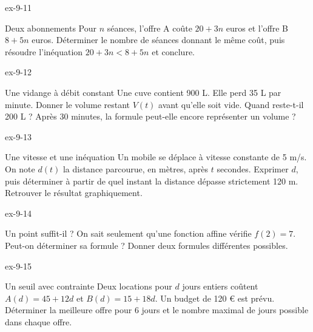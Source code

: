 \clearpage{}
\begin{blocLivre}{ex-9-11}\begin{exercice}[3]{Deux abonnements}
Pour $n$ séances, l’offre A coûte $20+3n$ euros et l’offre B $8+5n$ euros. Déterminer le nombre de séances donnant le même coût, puis résoudre l’inéquation $20+3n<8+5n$ et conclure.
\label{fig-ex-9-11}
\end{exercice}\end{blocLivre}
\begin{blocLivre}{ex-9-12}\begin{exercice}[3]{Une vidange à débit constant}
Une cuve contient 900 L. Elle perd 35 L par minute. Donner le volume restant $V(t)$ avant qu’elle soit vide. Quand reste-t-il 200 L ? Après 30 minutes, la formule peut-elle encore représenter un volume ?
\end{exercice}\end{blocLivre}
\begin{blocLivre}{ex-9-13}\begin{exercice}[3]{Une vitesse et une inéquation}
Un mobile se déplace à vitesse constante de 5 m/s. On note $d(t)$ la distance parcourue, en mètres, après $t$ secondes. Exprimer $d$, puis déterminer à partir de quel instant la distance dépasse strictement 120 m. Retrouver le résultat graphiquement.
\end{exercice}\end{blocLivre}
\begin{blocLivre}{ex-9-14}\begin{exercice}[3]{Un point suffit-il ?}
On sait seulement qu’une fonction affine vérifie $f(2)=7$. Peut-on déterminer sa formule ? Donner deux formules différentes possibles.
\end{exercice}\end{blocLivre}
\begin{blocLivre}{ex-9-15}\begin{exercice}[3]{Un seuil avec contrainte}
Deux locations pour $d$ jours entiers coûtent $A(d)=45+12d$ et $B(d)=15+18d$. Un budget de 120 € est prévu. Déterminer la meilleure offre pour 6 jours et le nombre maximal de jours possible dans chaque offre.
\end{exercice}\end{blocLivre}

\clearpage

